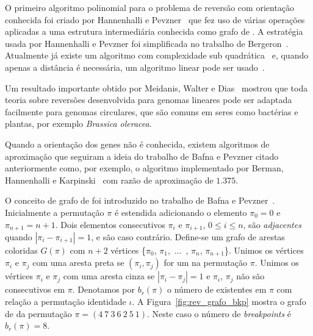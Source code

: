 O primeiro algoritmo polinomial para o problema de reversão com
orientação conhecida foi criado por Hannenhalli e
Pevzner~\cite{HannenhalliPevzner*1995} que fez uso de várias operações
aplicadas a uma estrutura intermediária conhecida como grafo de \bkp{}.
A estratégia usada por Hannenhalli e Pevzner foi simplificada no
trabalho de Bergeron~\cite{Bergeron*2005}. Atualmente já existe um
algoritmo com complexidade sub quadrática~\cite{TannierSagot*2004} e,
quando apenas a distância é necessária, um algoritmo linear pode ser
usado~\cite{BaderMoretYan*2001}.

Um resultado importante obtido por Meidanis, Walter e
Dias~\cite{MeidanisWalterDias*2000} mostrou que toda teoria sobre
reversões desenvolvida para genomas lineares pode ser adaptada
facilmente para genomas circulares, que são comuns em seres como
bactérias e plantas, por exemplo \textit{Brassica oleracea}.

Quando a orientação dos genes não é conhecida, existem algoritmos de
aproximação que seguiram a ideia do trabalho de Bafna e Pevzner citado
anteriormente como, por exemplo, o algoritmo implementado por Berman,
Hannenhalli e Karpinski~\cite{BermanHannenhalliKarpinski*2002} com razão
de aproximação de $1.375$.

O conceito de grafo de \bkp{} foi introduzido no trabalho de Bafna e
Pevzner~\cite{BafnaPevzner*1996}. Inicialmente a permutação $\pi$ é
estendida adicionando o elemento $\pi_{0} = 0$ e $\pi_{n+1} = n+1$. Dois
elementos consecutivos $\pi_{i}$ e $\pi_{i+1}$, $0 \le i \le n$, são
\textit{adjacentes} quando $|\pi_{i} - \pi_{i+1}| = 1$, e são
 caso contrário. Define-se um grafo de arestas
coloridas $G(\pi)$ com $n + 2$ vértices \{$\pi_{0}$,
$\pi_{1}$,~$\ldots$~, $\pi_{n}$, $\pi_{n + 1}$\}. Unimos os vértices
$\pi_{i}$ e $\pi_{j}$ com uma aresta preta se $(\pi_{i}, \pi_{j})$ for
um  na permutação $\pi$. Unimos os vértices $\pi_{i}$ e
$\pi_{j}$ com uma aresta cinza se $|\pi_{i} - \pi_{j}| = 1$ e $\pi_{i}$,
$\pi_{j}$ não são consecutivos em $\pi$. Denotamos por $b_r(\pi)$ o
número de \bkp{} existentes em $\pi$ com relação a permutação identidade
$\iota$. A Figura~\ref{fig:rev_grafo_bkp} mostra o grafo de \bkp{} da
permutação $\pi = (4~7~3~6~2~5~1)$. Neste caso o número de
\textit{breakpoints} é $b_r(\pi) = 8$.

